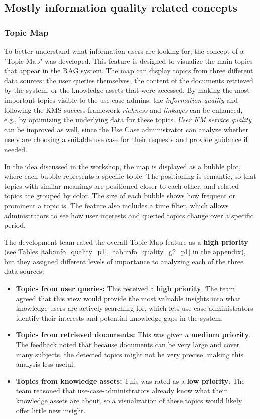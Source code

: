 \documentclass[
	english,
	ruledheaders=section,%
	class=report,%
	thesis={type=bachelor},%
	accentcolor=1b,%
	custommargins=true,%
	marginpar=false,%
	parskip=half-,%
	fontsize=11pt,%
	DIV=14,
]{tudapub}
\begin{document}
\subsection{Mostly information quality related concepts}
\subsubsection{Topic Map}
To better understand what information users are looking for, the concept of a "Topic Map" was developed. This feature is designed to visualize the main topics that appear in the RAG system. The map can display topics from three different data sources: the user queries themselves, the content of the documents retrieved by the system, or the knowledge assets that were accessed. By making the most important topics visible to the use case admins, the \textit{information quality} and following the KMS success framework \textit{richness} and \textit{linkages} \parencite[pp.~57--58]{Jennex2006} can be enhanced, e.g., by optimizing the underlying data for these topics. \textit{User KM service quality} \parencite[pp.~58--59]{Jennex2006} can be improved as well, since the Use Case administrator can analyze whether users are choosing a suitable use case for their requests and provide guidance if needed.

In the idea discussed in the workshop, the map is displayed as a bubble plot, where each bubble represents a specific topic. The positioning is semantic, so that topics with similar meanings are positioned closer to each other, and related topics are grouped by color. The size of each bubble shows how frequent or prominent a topic is. The feature also includes a time filter, which allows administrators to see how user interests and queried topics change over a specific period.

The development team rated the overall Topic Map feature as a \textbf{high priority} (see Tables  \ref{tab:info_quality_p1}, \ref{tab:info_quality_g2_p1} in the appendix), but they assigned different levels of importance to analyzing each of the three data sources:

\begin{itemize}
    \item \textbf{Topics from user queries:} This received a \textbf{high priority}. The team agreed that this view would provide the most valuable insights into what knowledge users are actively searching for, which lets use-case-administrators identify their interests and potential knowledge gaps in the system.
    
    \item \textbf{Topics from retrieved documents:} This was given a \textbf{medium priority}. The feedback noted that because documents can be very large and cover many subjects, the detected topics might not be very precise, making this analysis less useful.
    
    \item \textbf{Topics from knowledge assets:} This was rated as a \textbf{low priority}. The team reasoned that use-case-administrators already know what their knowledge assets are about, so a visualization of these topics would likely offer little new insight.
\end{itemize}
\end{document}

